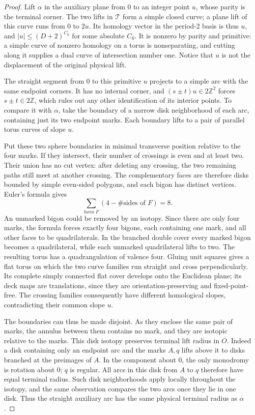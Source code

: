 \begin{proof}
Lift \(\alpha\) in the auxiliary plane from 0 to an integer point \(u\),
whose parity is the terminal corner. The two lifts in \(\mathcal T\) form a
simple closed curve; a plane lift of this curve runs from 0 to \(2u\).
Its homology vector in the period-2 basis is thus \(u\), and
\(|u|\le (D+2)^{C_0}\) for some absolute \(C_0\). It is nonzero by parity
and primitive: a simple curve of nonzero homology on a torus is
nonseparating, and cutting along it supplies a dual curve of intersection
number one. Notice that \(u\) is not the displacement of the original
physical lift.

The straight segment from 0 to this primitive \(u\) projects to a simple
arc with the same endpoint corners. It has no internal corner, and
\((s\pm t)u\in2\mathbb Z^2\) forces \(s\pm t\in2\mathbb Z\), which rules
out any other identification of its interior points. To compare it with
\(\alpha\), take the boundary of a narrow disk neighborhood of each arc,
containing just its two endpoint marks. Each boundary lifts to a pair of
parallel torus curves of slope \(u\).

Put these two sphere boundaries in minimal transverse position relative to
the four marks. If they intersect, their number of crossings is even and at
least two. Their union has no cut vertex: after deleting any crossing, the
two remaining paths still meet at another crossing. The complementary faces
are therefore disks bounded by simple even-sided polygons, and each bigon
has distinct vertices. Euler's formula gives
\[
 \sum_{\text{faces }F}(4-\#\text{sides of }F)=8.
\]
An unmarked bigon could be removed by an isotopy. Since there are only four
marks, the formula forces exactly four bigons, each containing one mark,
and all other faces to be quadrilaterals. In the branched double cover every
marked bigon becomes a quadrilateral, while each unmarked quadrilateral
lifts to two. The resulting torus has a quadrangulation of valence four.
Gluing unit squares gives a flat torus on which the two curve families run
straight and cross perpendicularly. Its complete simply connected flat
cover develops onto the Euclidean plane; its deck maps are translations,
since they are orientation-preserving and fixed-point-free. The crossing
families consequently have different homological slopes, contradicting
their common slope \(u\).

The boundaries can thus be made disjoint. As they enclose the same pair of
marks, the annulus between them contains no mark, and they are isotopic
relative to the marks. This disk isotopy preserves terminal lift radius in
\(O\). Indeed a disk containing only an endpoint arc and the marks
\(A,q\) lifts above it to disks branched at the preimages of \(A\). In the
component about 0, the only monodromy is rotation about 0; \(q\) is regular.
All arcs in this disk from \(A\) to \(q\) therefore have equal terminal
radius. Such disk neighborhoods apply locally throughout the isotopy, and
the same observation compares the two arcs once they lie in one disk.
Thus the straight auxiliary arc has the same physical terminal radius as
\(\alpha\).


\end{proof}
